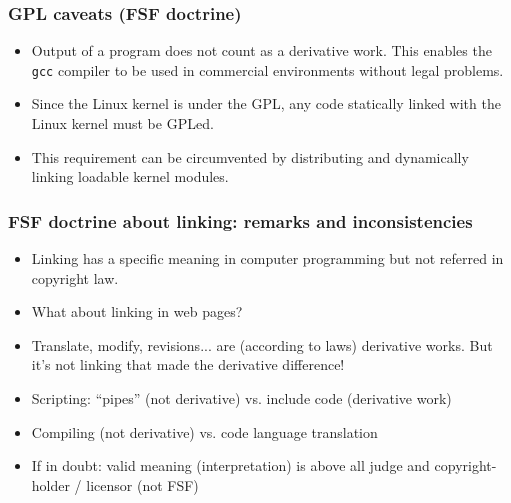 \documentclass{beamer}
\begin{document}
\begin{frame}
\frametitle{GPL caveats (FSF doctrine)}

\begin{itemize}
\item Output of a program does not count as a derivative work. This enables the \texttt{gcc} compiler to be used in commercial environments without legal problems.
\item Since the Linux kernel is under the GPL, any code statically linked with the Linux kernel must be GPLed. 
\item This requirement can be circumvented by distributing and dynamically linking loadable kernel modules.
\end{itemize}

\end{frame}


\begin{frame}
\frametitle{FSF doctrine about linking: remarks and inconsistencies}

\begin{itemize}
\item \alert{Linking} has a \alert{specific meaning} in computer programming but not referred in copyright law. 
\item What about linking in web pages?
\item Translate, modify, revisions... are (according to laws) derivative works. But it's not linking that made the derivative difference!
\item Scripting: ``pipes'' (not derivative) vs. include code (derivative work)
\item Compiling (not derivative) vs. code language translation
\item If in doubt: valid meaning (interpretation) is above all \alert{judge} and \alert{copyright-holder / licensor} (not FSF)  
\end{itemize}
\end{frame}



\end{document}
